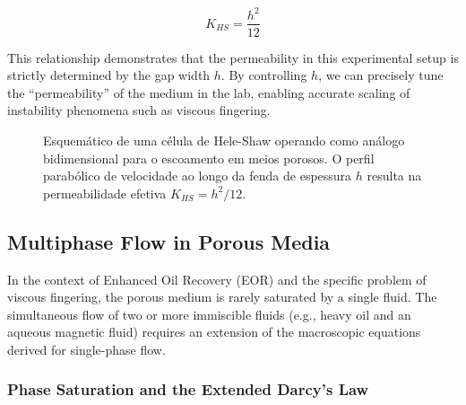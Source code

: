 \begin{equation}
    K_{HS} = \frac{h^2}{12}
\end{equation}

This relationship demonstrates that the permeability in this experimental setup is strictly determined by the gap width $h$.
By controlling $h$, we can precisely tune the ``permeability'' of the medium in the lab, enabling accurate scaling of instability phenomena such as viscous fingering.

\begin{figure}[H]
    \centering
    \caption{Esquemático de uma célula de Hele-Shaw operando como análogo bidimensional para o escoamento em meios porosos. O perfil parabólico de velocidade ao longo da fenda de espessura $h$ resulta na permeabilidade efetiva $K_{HS} = h^2/12$.}
    \label{fig:hele-shaw-cell}
\end{figure}

\subsection{Multiphase Flow in Porous Media}

In the context of Enhanced Oil Recovery (EOR) and the specific problem of viscous fingering, the porous medium is rarely saturated by a single fluid.
The simultaneous flow of two or more immiscible fluids (e.g., heavy oil and an aqueous magnetic fluid) requires an extension of the macroscopic equations derived for single-phase flow.

\subsubsection{Phase Saturation and the Extended Darcy's Law}

